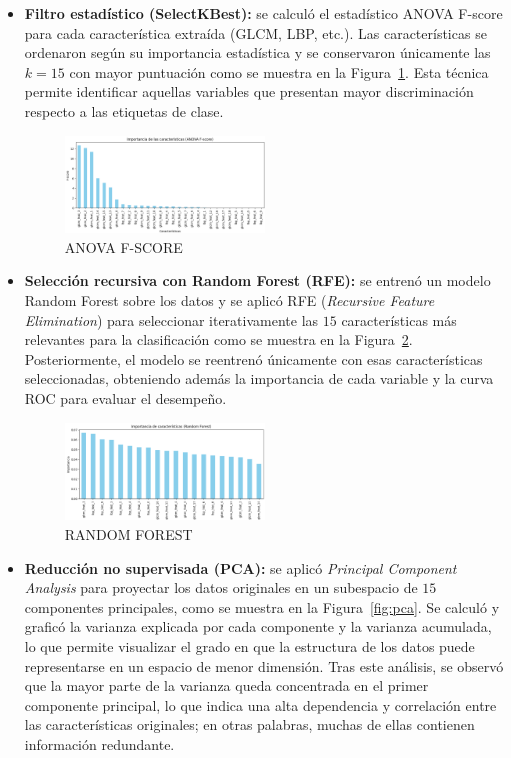 \documentclass[conference]{IEEEtran}
\begin{document}
\begin{itemize}
    \item \textbf{Filtro estadístico (SelectKBest):} se calculó el estadístico ANOVA F-score para cada característica extraída (GLCM, LBP, etc.). Las características se ordenaron según su importancia estadística y se conservaron únicamente las $k=15$ con mayor puntuación como se muestra en la Figura~\ref{fig:anova}. Esta técnica permite identificar aquellas variables que presentan mayor discriminación respecto a las etiquetas de clase.

    \begin{figure}[htbp]
    \centering
    \includegraphics[width=0.5\textwidth]{images/f scores.png}
    \caption{ANOVA F-SCORE}
    \label{fig:anova}
    \end{figure}
    
    \item \textbf{Selección recursiva con Random Forest (RFE):} se entrenó un modelo Random Forest sobre los datos y se aplicó RFE (\emph{Recursive Feature Elimination}) para seleccionar iterativamente las $15$ características más relevantes para la clasificación como se muestra en la Figura~\ref{fig:rfe}. Posteriormente, el modelo se reentrenó únicamente con esas características seleccionadas, obteniendo además la importancia de cada variable y la curva ROC para evaluar el desempeño.

    \begin{figure}[htbp]
    \centering
    \includegraphics[width=0.5\textwidth]{images/rf.png}
    \caption{RANDOM FOREST}
    \label{fig:rfe}
    \end{figure}
    


    \item \textbf{Reducción no supervisada (PCA):} se aplicó \emph{Principal Component Analysis} para proyectar los datos originales en un subespacio de $15$ componentes principales, como se muestra en la Figura~\ref{fig:pca}. Se calculó y graficó la varianza explicada por cada componente y la varianza acumulada, lo que permite visualizar el grado en que la estructura de los datos puede representarse en un espacio de menor dimensión. Tras este análisis, se observó que la mayor parte de la varianza queda concentrada en el primer componente principal, lo que indica una alta dependencia y correlación entre las características originales; en otras palabras, muchas de ellas contienen información redundante.


\end{itemize}
\end{document}
